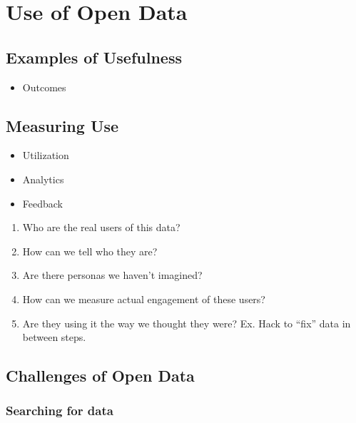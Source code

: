\documentclass[
]{book}
\providecommand{\tightlist}{%
  \setlength{\itemsep}{0pt}\setlength{\parskip}{0pt}}
\begin{document}
\hypertarget{use}{%
\chapter{Use of Open Data}\label{use}}

\hypertarget{examples-of-usefulness}{%
\section{Examples of Usefulness}\label{examples-of-usefulness}}

\begin{itemize}
\tightlist
\item
  Outcomes
\end{itemize}

\hypertarget{measuring-use}{%
\section{Measuring Use}\label{measuring-use}}

\begin{itemize}
\tightlist
\item
  Utilization
\item
  Analytics
\item
  Feedback
\end{itemize}

\begin{enumerate}
\def\labelenumi{\arabic{enumi}.}
\tightlist
\item
  Who are the real users of this data?
\item
  How can we tell who they are?
\item
  Are there personas we haven't imagined?
\item
  How can we measure actual engagement of these users?
\item
  Are they using it the way we thought they were? Ex. Hack to ``fix'' data in between steps.
\end{enumerate}

\hypertarget{challenges-of-open-data}{%
\section{Challenges of Open Data}\label{challenges-of-open-data}}

\hypertarget{searching-for-data}{%
\subsection{Searching for data}\label{searching-for-data}}
\end{document}
